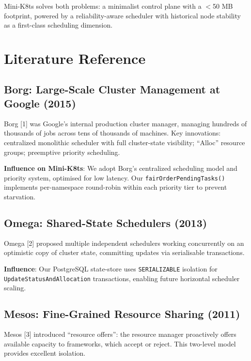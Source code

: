 \documentclass[11pt,a4paper]{article}
\begin{document}
Mini-K8ts solves both problems: a minimalist control plane with a $<$50 MB footprint,
powered by a reliability-aware scheduler with historical node stability as a first-class
scheduling dimension.

\section{Literature Reference}

\subsection{Borg: Large-Scale Cluster Management at Google (2015)}

Borg [1] was Google's internal production cluster manager, managing hundreds of thousands
of jobs across tens of thousands of machines. Key innovations: centralized monolithic
scheduler with full cluster-state visibility; ``Alloc'' resource groups; preemptive priority
scheduling.

\textbf{Influence on Mini-K8ts}: We adopt Borg's centralized scheduling model and priority
system, optimised for low latency. Our \texttt{fairOrderPendingTasks()} implements per-namespace
round-robin within each priority tier to prevent starvation.

\subsection{Omega: Shared-State Schedulers (2013)}

Omega [2] proposed multiple independent schedulers working concurrently on an optimistic copy
of cluster state, committing updates via serialisable transactions.

\textbf{Influence}: Our PostgreSQL state-store uses \texttt{SERIALIZABLE} isolation for
\texttt{UpdateStatusAndAllocation} transactions, enabling future horizontal scheduler scaling.

\subsection{Mesos: Fine-Grained Resource Sharing (2011)}

Mesos [3] introduced ``resource offers'': the resource manager proactively offers available
capacity to frameworks, which accept or reject. This two-level model provides excellent isolation.
\end{document}
